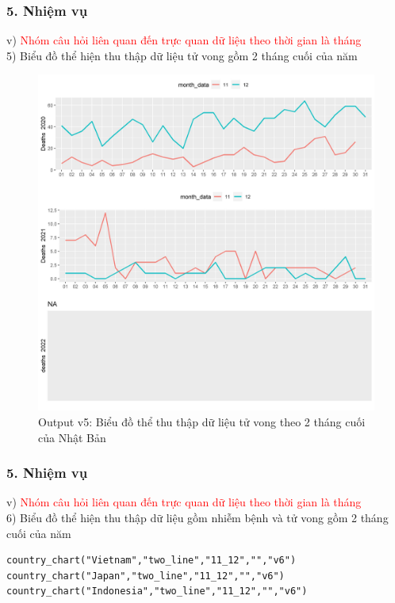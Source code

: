 \documentclass[english,10pt,table]{beamer}
\begin{document}
\begin{frame}[fragile]
\frametitle{5.  Nhiệm vụ}
v) \textcolor{red}{Nhóm câu hỏi liên quan đến trực quan dữ liệu theo thời gian là tháng}\\
    5) Biểu đồ thể hiện thu thập dữ liệu tử vong gồm 2 tháng cuối của năm
	\begin{figure}[h!]
	\begin{center}
		    \includegraphics[scale = 0.25]{Images/V/v5 Japan .jpeg}
		     \caption{Output v5: Biểu đồ thể thu thập dữ liệu tử vong theo 2 tháng cuối của Nhật Bản}
		\end{center}
		\end{figure}
\end{frame}

\begin{frame}[fragile]
\frametitle{5.  Nhiệm vụ}
v) \textcolor{red}{Nhóm câu hỏi liên quan đến trực quan dữ liệu theo thời gian là tháng}\\
    6) Biểu đồ thể hiện thu thập dữ liệu gồm nhiễm bệnh và tử vong gồm 2 tháng cuối của năm
\begin{lstlisting}[frame = single,basicstyle=\tiny]
country_chart("Vietnam","two_line","11_12","","v6")
country_chart("Japan","two_line","11_12","","v6")
country_chart("Indonesia","two_line","11_12","","v6")
		\end{lstlisting}
\end{frame}
\end{document}
